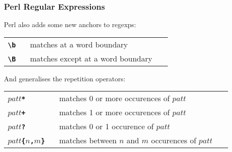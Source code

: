 \begin{frame}
\frametitle{Perl Regular Expressions}
Perl also adds some new anchors to regexps:

\begin{center}
\begin{tabular}{lll}

  \begin{minipage}{1cm}\textbf{\tt{{\textbackslash}b}} ~\end{minipage}
   & \begin{minipage}{18cm}matches at a word boundary~\end{minipage}
\\[1ex]

  \begin{minipage}{1cm}\textbf{\tt{{\textbackslash}B}} ~\end{minipage}
   & \begin{minipage}{18cm}matches except at a word boundary~\end{minipage}
\\[1ex]
\end{tabular}
\end{center}

And generalises the repetition operators:

\begin{center}
\begin{tabular}{lll}

  \begin{minipage}{1cm}$patt$\textbf{\tt{*}} ~\end{minipage}
   & \begin{minipage}{18cm}matches 0 or more occurences of $patt$~\end{minipage}
\\[1ex]

  \begin{minipage}{1cm}$patt$\textbf{\tt{+}} ~\end{minipage}
   & \begin{minipage}{18cm}matches 1 or more occurences of $patt$~\end{minipage}
\\[1ex]

  \begin{minipage}{1cm}$patt$\textbf{\tt{?}} ~\end{minipage}
   & \begin{minipage}{18cm}matches 0 or 1 occurence of $patt$~\end{minipage}
\\[1ex]

  \begin{minipage}{1cm}$patt$\textbf{\tt{\{}}$n$\textbf{\tt{,}}$m$\textbf{\tt{\}}} ~\end{minipage}
   & \begin{minipage}{18cm}matches between $n$ and $m$ occurences of $patt$~\end{minipage}
\\[1ex]
\end{tabular}
\end{center}

\end{frame}

